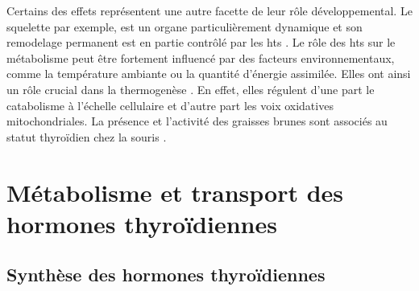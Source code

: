 \documentclass[../main.tex]{subfiles}
\begin{document}
Certains des effets représentent une autre facette de leur rôle développemental.
Le squelette par exemple, est un organe particulièrement dynamique et son remodelage permanent est en partie contrôlé par les \glspl{ht} \citep{Greenspan1999,Wojcicka2013a}.
Le rôle des \glspl{ht} sur le métabolisme peut être fortement influencé par des facteurs environnementaux, comme la température ambiante ou la quantité d'énergie assimilée.
Elles ont ainsi un rôle crucial dans la thermogenèse \citep{Bianco2005}.
En effet, elles régulent d'une part le catabolisme à l'échelle cellulaire et d'autre part les voix oxidatives mitochondriales. La présence et l'activité des graisses brunes sont associés au statut thyroïdien chez la souris \citep{Bianco2005}.






\section{Métabolisme et transport des hormones thyroïdiennes}\label{subsec:ht-metabolism}


\subsection{Synthèse des hormones thyroïdiennes}
\end{document}
